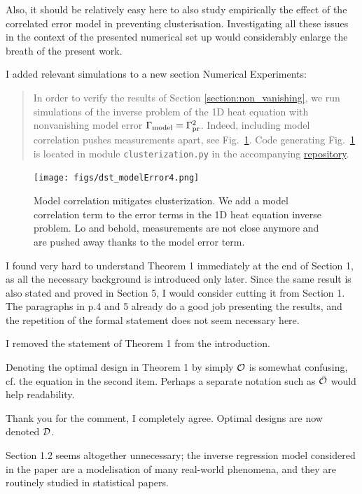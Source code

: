   
\RC Also, it should be relatively easy here to also study empirically
the effect of the correlated error model in preventing
clusterisation. Investigating all these issues in the context of the
presented numerical set up would considerably enlarge the breath of
the present work.

\AR I added relevant simulations to a new section Numerical
Experiments:


\begin{quote}
  In order to verify the results of Section
  \ref{section:non_vanishing}, we run simulations of the inverse
  problem of the 1D heat equation with nonvanishing model error
  \(\Gamma_{\textup{model}} = \Gamma_{\textup{pr}}^2 \). Indeed, including model correlation pushes
  measurements apart, see Fig.~\ref{fig:corr_errors}. Code generating
  Fig.~\ref{fig:corr_errors} is located in module
  \texttt{clusterization.py} in the accompanying
  \href{https://github.com/yairdaon/OED}{repository}.
\end{quote}
\begin{figure}
  \centering
  \texttt{[image: figs/dst\_modelError4.png]}
  \caption{Model correlation mitigates clusterization. We add a
    model correlation term to the error terms in the 1D heat
    equation inverse problem. Lo and behold, measurements are not
    close anymore and are pushed away thanks to the model error
    term.}
    \label{fig:corr_errors}
\end{figure}

  
\RC I found very hard to understand Theorem 1 immediately at the end
of Section 1, as all the necessary background is introduced only
later. Since the same result is also stated and proved in Section 5, I
would consider cutting it from Section 1. The paragraphs in p.4 and 5
already do a good job presenting the results, and the repetition of
the formal statement does not seem necessary here.

\AR I removed the statement of Theorem 1 from the introduction.


\RC Denoting the optimal design in Theorem 1 by simply $\mathcal{O}$ is
somewhat confusing, cf. the equation in the second item. Perhaps a
separate notation such as $\bar{\mathcal{O}}$ would help readability.

\AR Thank you for the comment, I completely agree. Optimal designs are
now denoted $\mathcal{D}$.

  
\RC Section 1.2 seems altogether unnecessary; the inverse regression
model considered in the paper are a modelisation of many real-world
phenomena, and they are routinely studied in statistical papers.

